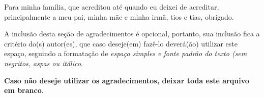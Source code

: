 \begin{agradecimentos}
Para minha família, que acreditou até quando eu deixei de acreditar, principalmente
a meu pai, minha mãe e minha irmã, tios e tias, obrigado.

A inclusão desta seção de agradecimentos é opcional, portanto, sua inclusão 
fica a critério do(s) autor(es), que caso deseje(em) fazê-lo deverá(ão) 
utilizar este espaço, seguindo a formatação de \textit{espaço simples e 
fonte padrão do texto (sem negritos, aspas ou itálico}.

\textbf{Caso não deseje utilizar os agradecimentos, deixar toda este arquivo
em branco}.
\end{agradecimentos}
